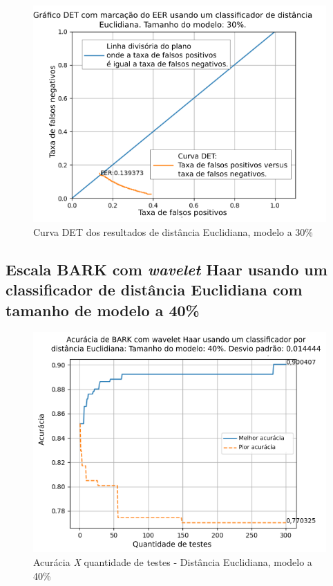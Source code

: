 \begin{figure}[ht]
	\centering
	\includegraphics[width=.9\linewidth]{images/results/det/DET_for_classifier_Euclidian_30}
	\caption{Curva DET dos resultados de distância Euclidiana, modelo a 30\%}
	\label{fig:detforclassifiereuclidian30}
\end{figure}

\subsection{Escala BARK com \textit{wavelet} Haar usando um classificador de distância Euclidiana com tamanho de modelo a 40\%}



\begin{figure}[ht]
	\centering
	\includegraphics[width=\linewidth]{images/results/confusionMatrices/classifier_Euclidian_40}
	\caption{Acurácia \textit{X} quantidade de testes - Distância Euclidiana, modelo a 40\%}
	\label{fig:classifiereuclidian40}
\end{figure}

